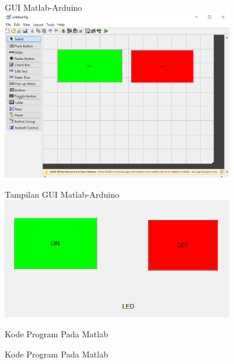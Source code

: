 \documentclass[10pt,xcolor={dvipsnames}]{beamer}
\begin{document}
\begin{frame}{GUI Matlab-Arduino}
	\centering
	\includegraphics[width=10cm]{Hasil Matlab/GUI MAtlab 1.png}
\end{frame}

\begin{frame}{Tampilan GUI Matlab-Arduino}
	\centering
	\includegraphics[width=10cm]{Hasil Matlab/GUI MAtlab arduino.png}
\end{frame}

\begin{frame}{Kode Program Pada Matlab}
	
\end{frame}

\begin{frame}{Kode Program Pada Matlab}
	
\end{frame}
\end{document}
